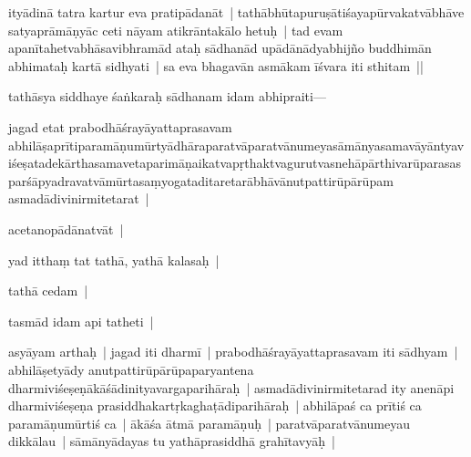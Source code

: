 \documentclass[article,12pt,a4paper]{memoir}
\begin{document}
	

	  \pstart ityādinā tatra kartur eva pratipādanāt | tathābhūtapuruṣātiśayapūrvakatvābhāve satyaprāmāṇyāc ceti nāyam atikrāntakālo hetuḥ | tad evam apanītahetvabhāsavibhramād ataḥ sādhanād upādānādyabhijño buddhimān abhimataḥ kartā sidhyati | sa  eva bhagavān asmākam īśvara iti sthitam ||
	\pend
      

	  \pstart {}\label{sarit__ratnakīrtinibandhāvali__102493}tathāsya siddhaye śaṅkaraḥ sādhanam idam abhipraiti—
	\pend
      

	  \pstart jagad etat prabodhāśrayāyattaprasavam \label{rnā__102330}abhilāṣa\label{rnā__102368}prītiparamāṇumūrtyādhāraparatvāparatvānumeyasāmānyasamavāyāntyaviśeṣatadekārthasamavetaparimāṇaikatvapṛthaktvagurutvasnehāpārthivarūparasasparśāpyadravatvāmūrtasaṃyogataditaretarābhāvānutpattirūpārūpam asmadādivinirmitetarat |
	\pend
      

	  \pstart acetanopādānatvāt |
	\pend
      

	  \pstart yad itthaṃ tat tathā, yathā kalasaḥ |
	\pend
      

	  \pstart tathā cedam |
	\pend
      

	  \pstart tasmād idam api tatheti |\label{sarit__ratnakīrtinibandhāvali__103091}
	\pend
      

	  \pstart asyāyam arthaḥ | jagad iti dharmī | prabodhāśrayāyattaprasavam iti sādhyam | \label{rnā__102859}abhilāṣe\label{rnā__102897}tyādy anutpattirūpārūpaparyantena dharmiviśeṣeṇākāśādinityavargaparihāraḥ | asmadādivinirmitetarad ity anenāpi dharmiviśeṣeṇa prasiddhakartṛkaghaṭādiparihāraḥ | \label{rnā__103110}abhilāpaś\label{rnā__103149} ca prītiś ca paramāṇumūrtiś ca | ākāśa ātmā paramāṇuḥ | paratvāparatvānumeyau dikkālau | sāmānyādayas tu yathāprasiddhā grahītavyāḥ |
	\pend
      
\end{document}
